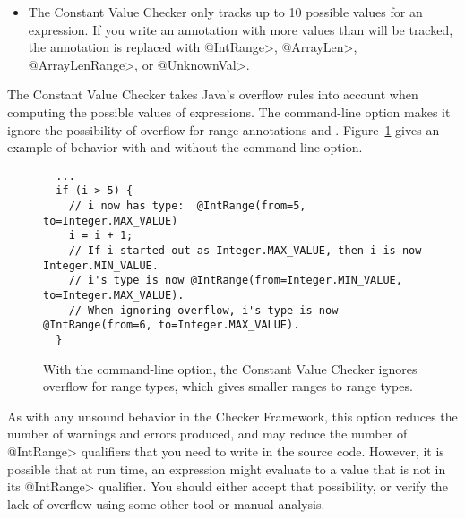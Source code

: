 \begin{sloppypar}
\begin{itemize}
\item {}

  The Constant Value Checker only tracks up to 10 possible values for an
  expression.  If you write an annotation with more values than will be
  tracked, the annotation is replaced with \<@IntRange>, \<@ArrayLen>, \<@ArrayLenRange>, or \<@UnknownVal>.

\end{itemize}
\end{sloppypar}



The Constant Value Checker takes Java's overflow rules into account when
computing the possible values of expressions.
%
The  command-line option makes it ignore the
possibility of overflow for range annotations
 and
.
%
Figure~\ref{fig-value-ignore-overflow} gives an example of behavior with
and without the  command-line option.

\begin{figure}
\begin{Verbatim}
  ...
  if (i > 5) {
    // i now has type:  @IntRange(from=5, to=Integer.MAX_VALUE)
    i = i + 1;
    // If i started out as Integer.MAX_VALUE, then i is now Integer.MIN_VALUE.
    // i's type is now @IntRange(from=Integer.MIN_VALUE, to=Integer.MAX_VALUE).
    // When ignoring overflow, i's type is now @IntRange(from=6, to=Integer.MAX_VALUE).
  }
\end{Verbatim}
\caption{With the  command-line option,
the Constant Value Checker ignores overflow
for range types, which gives smaller ranges to range types.}
\label{fig-value-ignore-overflow}
\end{figure}

As with any unsound behavior in the Checker Framework, this option reduces
the number of warnings and errors produced, and may reduce the number of
\<@IntRange> qualifiers that you need to write in the source code.
However, it is possible that at run time, an expression might evaluate to a
value that is not in its \<@IntRange> qualifier.  You should either accept
that possibility, or verify the lack of overflow using some other tool or
manual analysis.


